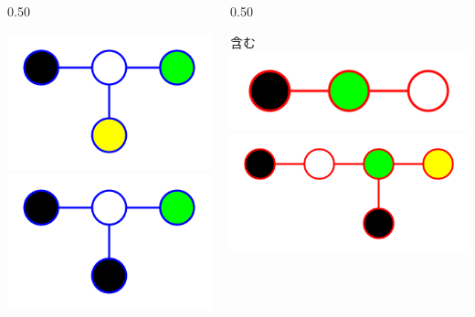 \begin{tcolorbox}[title={\Large Gradient~Boosting~Decition~Tree}]
\begin{columns}[t]
\begin{column}{0.50\hsize}
\begin{tcolorbox}[colback=white]
			\includegraphics[height=1.4\baselineskip]{img/graph/g05b.png} \hspace{10px}
			\includegraphics[height=1.4\baselineskip]{img/graph/g06b.png}
		\end{tcolorbox}
		\end{column}
		\begin{column}{0.50\hsize}
		\begin{tcolorbox}[colback=white,colframe=red]
			含む \\
			\includegraphics[height=0.7\baselineskip]{img/graph/g01r.png} \hspace{30px}
			\includegraphics[height=1.4\baselineskip]{img/graph/g07r.png} \\
		\end{tcolorbox}
		\end{column}
	\end{columns}


\end{tcolorbox}
